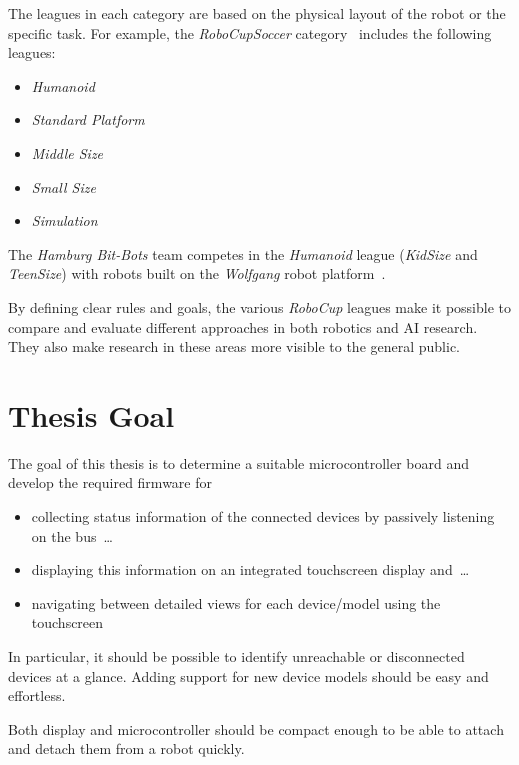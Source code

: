 The leagues in each category are based on the physical layout of the robot or the specific task. For
example, the \textit{RoboCupSoccer} category~\cite{robocup-soccer} includes the following leagues:

\begin{itemize}
    \item \textit{Humanoid}
    \item \textit{Standard Platform}
    \item \textit{Middle Size}
    \item \textit{Small Size}
    \item \textit{Simulation}
\end{itemize}

The \textit{Hamburg Bit-Bots} team competes in the \textit{Humanoid} league (\textit{KidSize} and
\textit{TeenSize}) with robots built on the \textit{Wolfgang} robot platform~\cite{robocup-humanoid-teams}.

By defining clear rules and goals, the various \textit{RoboCup} leagues make it possible to compare
and evaluate different approaches in both robotics and AI research. They also make research in these
areas more visible to the general public.

\section{Thesis Goal}
\label{introduction/thesis-goal}

The goal of this thesis is to determine a suitable microcontroller board and develop
the required firmware for

\begin{itemize}
    \item collecting status information of the connected devices by passively listening on the bus~\dots
    \item displaying this information on an integrated touchscreen display and~\dots
    \item navigating between detailed views for each device/model using the touchscreen
\end{itemize}

In particular, it should be possible to identify unreachable or disconnected devices at a glance.
Adding support for new device models should be easy and effortless.

Both display and microcontroller should be compact enough to be able to attach and detach them
from a robot quickly.
